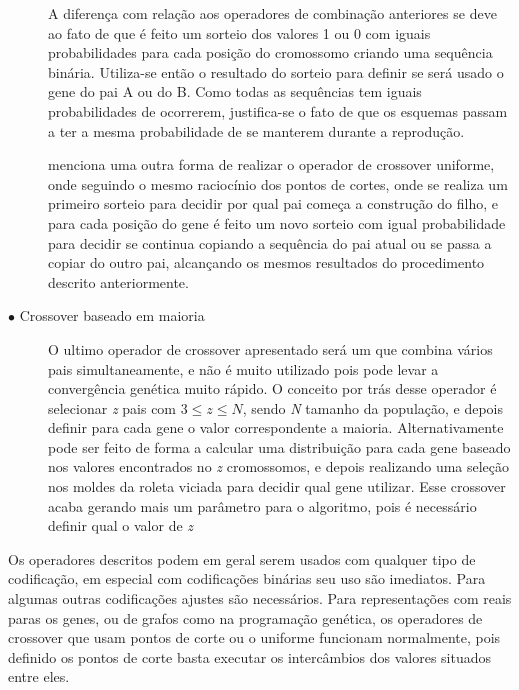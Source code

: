 \begin{description}
A diferença com relação aos operadores de combinação anteriores se deve ao fato de que é feito um sorteio dos valores 1 ou 0 com iguais probabilidades para cada posição do cromossomo criando uma sequência binária. Utiliza-se então o resultado do sorteio para definir se será usado o gene do pai A ou do B. Como todas as sequências tem iguais probabilidades de ocorrerem, justifica-se o fato de que os esquemas passam a ter a mesma probabilidade de se manterem durante a reprodução.

\citeauthor{Mitchell1996} menciona uma outra forma de realizar o operador de crossover uniforme, onde seguindo o mesmo raciocínio dos pontos de cortes, onde se realiza um primeiro sorteio para decidir por qual pai começa a construção do filho, e para cada posição do gene é feito um novo sorteio com igual probabilidade para decidir se continua copiando a sequência do pai atual ou se passa a copiar do outro pai, alcançando os mesmos resultados do procedimento descrito anteriormente.

\item[$\bullet$ Crossover baseado em maioria] \text{}

O ultimo operador de crossover apresentado será um que combina vários pais simultaneamente, e não é muito utilizado pois pode levar a convergência genética muito rápido. O conceito por trás desse operador é selecionar \textit{z} pais com \(3 \le z \le N\), sendo \textit{N} tamanho da população, e depois definir para cada gene o valor correspondente a maioria. Alternativamente pode ser feito de forma a calcular uma distribuição para cada gene baseado nos valores encontrados no \textit{z} cromossomos, e depois realizando uma seleção nos moldes da roleta viciada para decidir qual gene utilizar. Esse crossover acaba gerando mais um parâmetro para o algoritmo, pois é necessário definir qual o valor de \textit{z}
 
\end{description}

Os operadores descritos podem em geral serem usados com qualquer tipo de codificação, em especial com codificações binárias seu uso são imediatos. Para algumas outras codificações ajustes são necessários. Para representações com reais paras os genes, ou de grafos como na programação genética, os operadores de crossover que usam pontos de corte ou o uniforme funcionam normalmente, pois definido os pontos de corte basta executar os intercâmbios dos valores situados entre eles. 


